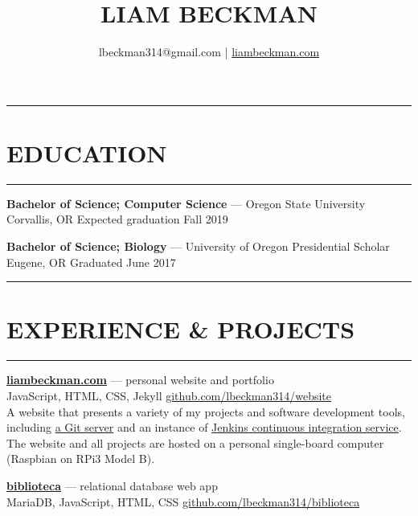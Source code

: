 \documentclass[a4paper]{article}
\title{\textcolor{my-red}{LIAM BECKMAN}}
\author{lbeckman314@gmail.com |  \href{https://liambeckman.com}{liambeckman.com}}
\date{\vspace{-5ex}}
\begin{document}
\maketitle

\rule{\textwidth}{1pt}\vspace{-1.5em}
\section*{\large{EDUCATION}}\vspace{-1.5em}
\textcolor{my-grey}{\rule{\linewidth}{1pt}}

\medbreak

\textbf{Bachelor of Science; Computer Science} --- Oregon State University\\
\textcolor{my-grey}{Corvallis, OR \hfill Expected graduation Fall 2019}

\textcolor{my-grey}{\dotfill}
\medbreak

\textbf{Bachelor of Science; Biology} --- University of Oregon Presidential Scholar\\
\textcolor{my-grey}{Eugene, OR \hfill Graduated June 2017}

\medbreak

\noindent\rule{\textwidth}{1pt}\vspace{-1.5em}
\section*{\large{EXPERIENCE \& PROJECTS}}\vspace{-1.5em}
\textcolor{my-grey}{\rule{\linewidth}{1pt}}


\textcolor{my-blue}{\textbf{\href{https://liambeckman.com}{liambeckman.com}}} --- personal website and portfolio\\
\textcolor{my-grey}{JavaScript, HTML, CSS, Jekyll \hfill \href{https://github.com/lbeckman314/website}{github.com/lbeckman314/website}}\\

A website that presents a variety of my projects and software development tools, including \href{https://git.liambeckman.com}{a Git server} and an instance of \href{https://liambeckman.com/jenkins}{Jenkins continuous integration service}. The website and all projects are hosted on a personal single-board computer (Raspbian on RPi3 Model B).

\textcolor{my-grey}{\dotfill}
\medbreak

\textcolor{my-blue}{\textbf{\href{https://biblioteca.liambeckman.com}{biblioteca}}} --- relational database web app\\
\textcolor{my-grey}{MariaDB, JavaScript, HTML, CSS \hfill \href{https://github.com/lbeckman314/biblioteca}{github.com/lbeckman314/biblioteca}}\\
\end{document}
